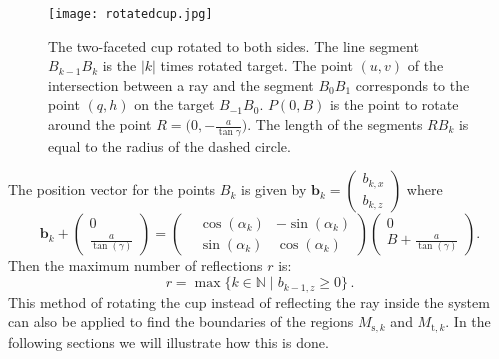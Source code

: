 \begin{figure}[htbp]%
 \begin{center}
  \texttt{[image: rotatedcup.jpg]}
  \end{center}
 \caption{\footnotesize{The two-faceted cup rotated to both sides. The line segment $B_{k-1}B_{k}$ is the $|k|$ times rotated target. The point $(u,v)$ of the intersection between a ray and the segment $B_0B_1$ corresponds to the point $(q,h)$ on the target $B_{-1}B_{0}$. $P(0,B)$ is the point to rotate around the point $R = \big(0,-\frac{a}{\tan{\gamma}}\big)$. The length of the segments $RB_k$ is equal to the radius of the dashed circle.}}
  \label{fig:twofaced}
  \end{figure}
The position vector for the points $B_k$ is given by
$ \textbf{b}_k =
 \begin{pmatrix}   b_{k,x}\\  b_{k,z}
 \end{pmatrix} $
where
\begin{equation}
 \textbf{b}_k+
  \begin{pmatrix} 0  \\  \frac{a}{\tan(\gamma)}\end{pmatrix}=
 \left(\begin{split}  & \cos(\alpha_k)  & -\sin(\alpha_k) \\  & \sin(\alpha_k) & \cos(\alpha_k)\end{split}\right)
 \begin{pmatrix}  0 \\  B+\frac{a}{\tan(\gamma)}\end{pmatrix}.
\end{equation}
Then the maximum number of reflections $r$ is:
\begin{equation}
r=\max\{k\in\mathbb{N} \;| \; b_{k-1,z}\geq 0\}\,.
\end{equation}
This method of rotating the cup instead of reflecting the ray inside the system can also be applied to find the boundaries of the regions
$M_{\textrm{s},k}$ and $M_{\textrm{t},k}$. In the following sections we will illustrate how this is done.
\\




